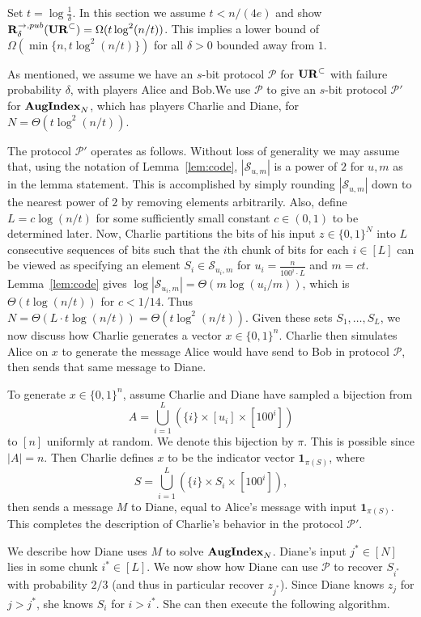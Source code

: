 Set $t = \log \frac 1{\delta}$. In this section we assume $t < n/(4e)$ and show $\mathbf{R}^{\rightarrow,pub}_\delta(\mathbf{UR}^\subset) = \Omega(t\log^2(n/t))$. This implies a lower bound of $\Omega(\min\{n, t\log^2(n/t)\})$ for all $\delta>0$ bounded away from $1$.

As mentioned, we assume we have an $s$-bit protocol $\mathcal P$ for $\mathbf{UR}^\subset$ with failure probability $\delta$, with players Alice and Bob.We use $\mathcal P$ to give an $s$-bit protocol $\mathcal P'$ for $\mathbf{AugIndex}_N$, which has players Charlie and Diane, for $N = \Theta(t\log^2(n/t))$.

The protocol $\mathcal P'$ operates as follows. Without loss of generality we may assume that, using the notation of Lemma~\ref{lem:code}, $|\mathcal S_{u,m}|$ is a power of $2$ for $u, m$ as in the lemma statement. This is accomplished by simply rounding $|\mathcal S_{u,m}|$ down to the nearest power of $2$ by removing elements arbitrarily. Also, define $L = c\log(n/t)$ for some sufficiently small constant $c\in(0,1)$ to be determined later. Now, Charlie partitions the bits of his input $z\in\{0,1\}^N$ into $L$ consecutive sequences of bits such that the $i$th chunk of bits for each $i\in[L]$ can be viewed as specifying an element $S_i\in \mathcal S_{u_i,m}$ for $u_i = \frac n{100^i\cdot L}$ and $m = ct$. Lemma~\ref{lem:code} gives $\log|\mathcal S_{u_i,m}| = \Theta(m\log(u_i/m))$, which is $\Theta(t\log(n/t))$ for $c < 1/14$. Thus $N = \Theta(L\cdot t\log(n/t)) = \Theta(t\log^2(n/t))$. Given these sets $S_1,\ldots,S_L$, we now discuss how Charlie generates a vector $x\in\{0,1\}^n$. Charlie then simulates Alice on $x$ to generate the message Alice would have send to Bob in protocol $\mathcal P$, then sends that same message to Diane.

To generate $x\in\{0,1\}^n$, assume Charlie and Diane have sampled a bijection from 
\begin{equation}\label{eq:pi-origin}
A = \bigcup_{i=1}^L (\{i\} \times [u_i]\times [100^i])
\end{equation}
to $[n]$ uniformly at random. We denote this bijection by $\pi$. This is possible since $|A| = n$. Then Charlie defines $x$ to be the indicator vector $\mathbf{1}_{\pi(S)}$, where
$$
S = \bigcup_{i=1}^L (\{i\} \times S_i \times [100^i]),
$$
then sends a message $M$ to Diane, equal to Alice's message with input $\mathbf{1}_{\pi(S)}$. This completes the description of Charlie's behavior in the protocol $\mathcal P'$.

We describe how Diane uses $M$ to solve $\mathbf{AugIndex}_N$. Diane's input $j^*\in[N]$ lies in some chunk $i^*\in[L]$. We now show how Diane can use $\mathcal P$ to recover $S_{i^*}$ with probability $2/3$ (and thus in particular recover $z_{j^*}$). Since Diane knows $z_j$ for $j>j^*$, she knows $S_i$ for $i>i^*$. She can then execute the following algorithm.


